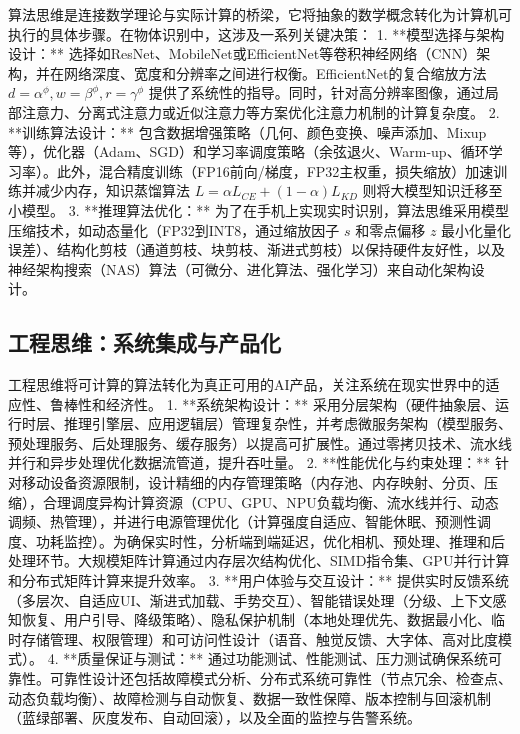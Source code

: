 算法思维是连接数学理论与实际计算的桥梁，它将抽象的数学概念转化为计算机可执行的具体步骤。在物体识别中，这涉及一系列关键决策：
1.  **模型选择与架构设计：** 选择如ResNet、MobileNet或EfficientNet等卷积神经网络（CNN）架构，并在网络深度、宽度和分辨率之间进行权衡。EfficientNet的复合缩放方法 $d=\alpha^\phi, w=\beta^\phi, r=\gamma^\phi$ 提供了系统性的指导。同时，针对高分辨率图像，通过局部注意力、分离式注意力或近似注意力等方案优化注意力机制的计算复杂度。
2.  **训练算法设计：** 包含数据增强策略（几何、颜色变换、噪声添加、Mixup等），优化器（Adam、SGD）和学习率调度策略（余弦退火、Warm-up、循环学习率）。此外，混合精度训练（FP16前向/梯度，FP32主权重，损失缩放）加速训练并减少内存，知识蒸馏算法 $L = \alpha L_{CE} + (1-\alpha)L_{KD}$ 则将大模型知识迁移至小模型。
3.  **推理算法优化：** 为了在手机上实现实时识别，算法思维采用模型压缩技术，如动态量化（FP32到INT8，通过缩放因子 $s$ 和零点偏移 $z$ 最小化量化误差）、结构化剪枝（通道剪枝、块剪枝、渐进式剪枝）以保持硬件友好性，以及神经架构搜索（NAS）算法（可微分、进化算法、强化学习）来自动化架构设计。

\subsection*{工程思维：系统集成与产品化}

工程思维将可计算的算法转化为真正可用的AI产品，关注系统在现实世界中的适应性、鲁棒性和经济性。
1.  **系统架构设计：** 采用分层架构（硬件抽象层、运行时层、推理引擎层、应用逻辑层）管理复杂性，并考虑微服务架构（模型服务、预处理服务、后处理服务、缓存服务）以提高可扩展性。通过零拷贝技术、流水线并行和异步处理优化数据流管道，提升吞吐量。
2.  **性能优化与约束处理：** 针对移动设备资源限制，设计精细的内存管理策略（内存池、内存映射、分页、压缩），合理调度异构计算资源（CPU、GPU、NPU负载均衡、流水线并行、动态调频、热管理），并进行电源管理优化（计算强度自适应、智能休眠、预测性调度、功耗监控）。为确保实时性，分析端到端延迟，优化相机、预处理、推理和后处理环节。大规模矩阵计算通过内存层次结构优化、SIMD指令集、GPU并行计算和分布式矩阵计算来提升效率。
3.  **用户体验与交互设计：** 提供实时反馈系统（多层次、自适应UI、渐进式加载、手势交互）、智能错误处理（分级、上下文感知恢复、用户引导、降级策略）、隐私保护机制（本地处理优先、数据最小化、临时存储管理、权限管理）和可访问性设计（语音、触觉反馈、大字体、高对比度模式）。
4.  **质量保证与测试：** 通过功能测试、性能测试、压力测试确保系统可靠性。可靠性设计还包括故障模式分析、分布式系统可靠性（节点冗余、检查点、动态负载均衡）、故障检测与自动恢复、数据一致性保障、版本控制与回滚机制（蓝绿部署、灰度发布、自动回滚），以及全面的监控与告警系统。

